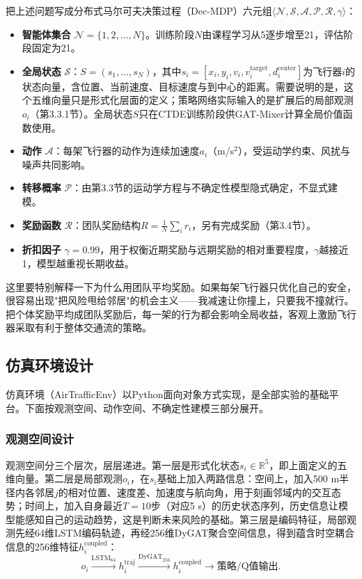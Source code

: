 \documentclass[12pt,a4paper,UTF8]{ctexart}
\begin{document}
把上述问题写成分布式马尔可夫决策过程（Dec-MDP）\cite{ref41}六元组$\langle \mathcal{N}, \mathcal{S}, \mathcal{A}, \mathcal{P}, \mathcal{R}, \gamma \rangle$：

\begin{itemize}
    \item \textbf{智能体集合} $\mathcal{N} = \{1, 2, \ldots, N\}$。训练阶段$N$由课程学习从5逐步增至21，评估阶段固定为21。
    \item \textbf{全局状态} $\mathcal{S}$：$S = (s_1, \ldots, s_N)$，其中$s_i = [x_i, y_i, v_i, v_i^{\text{target}}, d_i^{\text{center}}]$为飞行器$i$的状态向量，含位置、当前速度、目标速度与到中心的距离。需要说明的是，这个五维向量只是形式化层面的定义；策略网络实际输入的是扩展后的局部观测$o_i$（第3.3.1节）。全局状态$S$只在CTDE训练阶段供GAT-Mixer计算全局价值函数使用。
    \item \textbf{动作} $\mathcal{A}$：每架飞行器的动作为连续加速度$a_i$（m/s$^2$），受运动学约束、风扰与噪声共同影响。
    \item \textbf{转移概率} $\mathcal{P}$：由第3.3节的运动学方程与不确定性模型隐式确定，不显式建模。
    \item \textbf{奖励函数} $\mathcal{R}$：团队奖励结构$R = \frac{1}{N}\sum_i r_i$，另有完成奖励（第3.4节）。
    \item \textbf{折扣因子} $\gamma = 0.99$，用于权衡近期奖励与远期奖励的相对重要程度，$\gamma$越接近1，模型越重视长期收益。
\end{itemize}

这里要特别解释一下为什么用团队平均奖励。如果每架飞行器只优化自己的安全，很容易出现"把风险甩给邻居"的机会主义——我减速让你撞上，只要我不撞就行。把个体奖励平均成团队奖励后，每一架的行为都会影响全局收益，客观上激励飞行器采取有利于整体交通流的策略。

\subsection{仿真环境设计}

仿真环境（AirTrafficEnv）以Python面向对象方式实现，是全部实验的基础平台。下面按观测空间、动作空间、不确定性建模三部分展开。

\subsubsection{观测空间设计}

观测空间分三个层次，层层递进。第一层是形式化状态$s_i\in\mathbb{R}^5$，即上面定义的五维向量。第二层是局部观测$o_i$，在$s_i$基础上加入两路信息：空间上，加入500 m半径内各邻居$j$的相对位置、速度差、加速度与航向角，用于刻画邻域内的交互态势；时间上，加入自身最近$T=10$步（对应5 s）的历史状态序列，历史信息让模型能感知自己的运动趋势，这是判断未来风险的基础。第三层是编码特征，局部观测先经64维LSTM编码轨迹，再经256维DyGAT聚合空间信息，得到蕴含时空耦合信息的256维特征$h_i^{\text{coupled}}$：
\begin{equation}
    o_i \xrightarrow{\text{LSTM}_{64}} h_i^{\text{traj}} \xrightarrow{\text{DyGAT}_{256}} h_i^{\text{coupled}} \rightarrow \text{策略/Q值输出}.
    \label{eq:encoding_chain}
\end{equation}
\end{document}
